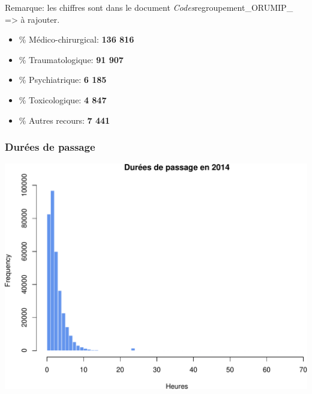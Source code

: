 \documentclass[]{article}
\begin{document}
Remarque: les chiffres sont dans le document
\emph{Codes}regroupement\_ORUMIP\_ =\textgreater{} à rajouter.

\begin{itemize}
\itemsep1pt\parskip0pt
\item
  \% Médico-chirurgical: \textbf{136 816}
\item
  \% Traumatologique: \textbf{91 907}
\item
  \% Psychiatrique: \textbf{6 185}
\item
  \% Toxicologique: \textbf{4 847}
\item
  \% Autres recours: \textbf{7 441}
\end{itemize}

\subsubsection{Durées de passage}\label{durees-de-passage}

\includegraphics{rapport2014_V4_files/figure-latex/passages-1.pdf}
\end{document}
